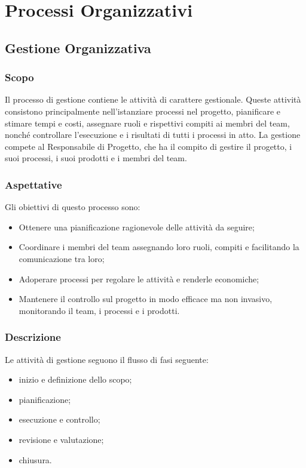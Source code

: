 \section{Processi Organizzativi}
	\subsection{Gestione Organizzativa}
		\subsubsection{Scopo}
		Il processo di gestione contiene le attività di carattere gestionale. Queste attività consistono principalmente nell'istanziare processi nel progetto, pianificare e stimare tempi e costi, assegnare ruoli e rispettivi compiti ai membri del team, nonché controllare l'esecuzione e i risultati di tutti i processi in atto. La gestione compete al Responsabile di Progetto, che ha il compito di gestire il progetto, i suoi processi, i suoi prodotti e i membri del team.
		\subsubsection{Aspettative}
		Gli obiettivi di questo processo sono:
		\begin{itemize}
			\item Ottenere una pianificazione ragionevole delle attività da seguire;
			\item Coordinare i membri del team assegnando loro ruoli, compiti e facilitando la comunicazione tra loro;
			\item Adoperare processi per regolare le attività e renderle economiche;
			\item Mantenere il controllo sul progetto in modo efficace ma non invasivo, monitorando il team, i processi e i prodotti.
		\end{itemize}
		\subsubsection{Descrizione}
		Le attività di gestione seguono il flusso di fasi seguente:
		\begin{itemize}
			\item inizio e definizione dello scopo;
			\item pianificazione;
			\item esecuzione e controllo;
			\item revisione e valutazione;
			\item chiusura.
		\end{itemize}
